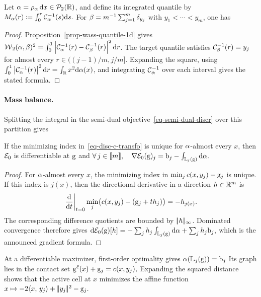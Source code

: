 \begin{prop}\label{prop-semidiscrete-1d-quantile}
Let \(\alpha=\rho_\alpha\,\mathrm{d} x\in\mathcal{P}_2(\mathbb{R})\), and define its integrated quantile by
\(
M_\alpha(r) \coloneqq \int_0^r \mathcal{C}_{\alpha}^{-1}(s)\mathrm{d} s.
\)
For
\(
\beta=m^{-1}\sum_{j=1}^m\delta_{y_j}
\)
with \(y_1<\cdots<y_m\), one has
\end{prop}
\begin{proof}
Proposition~\ref{prop-wass-quantile-1d} gives \(\operatorname{\mathcal{W}}_2(\alpha,\beta)^2=\int_0^1\left\lvert\mathcal{C}_{\alpha}^{-1}(r)-\mathcal{C}_{\beta}^{-1}(r)\right\rvert^2\mathrm{d} r\). The target quantile satisfies \(\mathcal{C}_{\beta}^{-1}(r)=y_j\) for almost every \(r\in((j-1)/m,j/m]\). Expanding the square, using \(\int_0^1\left\lvert\mathcal{C}_{\alpha}^{-1}(r)\right\rvert^2\mathrm{d} r=\int_{\mathbb{R}} x^2\mathrm{d}\alpha(x)\), and integrating \(\mathcal{C}_{\alpha}^{-1}\) over each interval gives the stated formula.
\end{proof}
\paragraph{Mass balance.}
Splitting the integral in the semi-dual objective~\eqref{eq-semi-dual-discr} over this partition gives
\begin{prop}\label{prop-semidiscrete-dual-gradient}
If the minimizing index in~\eqref{eq-disc-c-transfo} is unique for $\alpha$-almost every $x$, then $\mathcal{E}_0$ is differentiable at $\mathrm{g}$ and
\(\forall \, j \in \llbracket m\rrbracket, \quad \nabla\mathcal{E}_0(\mathrm{g})_j = \mathrm{b}_j - \int_{\mathbb{L}_{j}(\mathrm{g})} \mathrm{d}\alpha.\)
\end{prop}
\begin{proof}
For $\alpha$-almost every $x$, the minimizing index in $\min_j c(x,y_j)-\mathrm{g}_j$ is unique. If this index is $j(x)$, then the directional derivative in a direction $h\in\mathbb{R}^m$ is
\[
\left.\frac{\mathrm{d}}{\mathrm{d} t}\right|_{t=0}
\min_j \bigl(c(x,y_j)-(\mathrm{g}_j+t h_j)\bigr)
=
-h_{j(x)}.
\]
The corresponding difference quotients are bounded by $|\!| h |\!|_\infty$. Dominated convergence therefore gives \(\mathrm{d}\mathcal{E}_0(\mathrm{g})[h] = -\sum_j h_j\int_{\mathbb{L}_j(\mathrm{g})}\mathrm{d}\alpha +\sum_j h_j\mathrm{b}_j,\)
which is the announced gradient formula.
\end{proof}
At a differentiable maximizer, first-order optimality gives
\(
\alpha(\mathbb{L}_j(\mathrm{g}))=\mathrm{b}_j
\)
Its graph lies in the contact set
\(
\mathrm{g}^{\bar c}(x)+\mathrm{g}_j=c(x,y_j),
\)
Expanding the squared distance shows that the active cell at $x$ minimizes the affine function
\(
x\mapsto -2\langle x,\,y_j\rangle+|\!| y_j |\!|^2-\mathrm{g}_j.
\)
